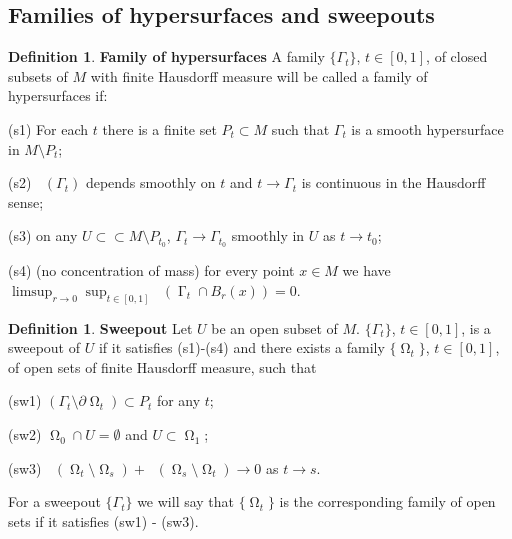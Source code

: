 \documentclass[12pt]{amsart}
\DeclareMathOperator{\Hn}{\mathcal{H}^n}
\DeclareMathOperator{\Hnn}{\mathcal{H}^{n+1}}
\DeclareMathOperator{\G}{\Gamma}
\DeclareMathOperator{\Om}{\Omega}
\theoremstyle{definition}
\newtheorem{definition}[theorem]{Definition}
\begin{document}
\subsection{Families of hypersurfaces
and sweepouts}

\begin{definition} \label{hypersurface_def}
\textbf{Family of hypersurfaces}
A family $\{\Gamma_t\}$, $t\in [0,1]$,
of closed subsets of $M$ with
finite Hausdorff measure 
will be called a family of hypersurfaces if:

\vspace{0.2in}

(s1) For each $t$ there is a finite set 
$P_t \subset M$ such that $\Gamma_t$ is a smooth
hypersurface in $M \setminus P_t$;

(s2) $\Hn(\Gamma_t)$ depends smoothly 
on $t$ and $t \rightarrow \Gamma_t$
is continuous in the
Hausdorff sense;

(s3) on any $U \subset \subset M \setminus P_{t_0}$, $\Gamma_t \rightarrow \Gamma_{t_0}$
smoothly in $U$ as $t \rightarrow t_0$;

(s4) (no concentration of mass) for every point $x \in M$ 
we have $\limsup_{r \rightarrow 0} \sup_{t \in [0,1]}  \Hn(\G_t \cap B_r(x)) = 0$.
\end{definition}


\begin{definition} \label{def: sweepout}
\textbf{Sweepout}
Let $U$ be an open subset of $M$.
$\{\Gamma_t \}$, $t \in [0,1]$, is a sweepout of $U$ 
if it satisfies (s1)-(s4) and there exists a family $\{  \Om_t\}$, 
$t \in [0,1]$, of open
sets of finite Hausdorff measure, such that

\vspace{0.2in}

(sw1) $(\Gamma_t  \setminus \partial   \Om_t)
\subset P_t$ for any $t$;

(sw2) $  \Om_0 \cap U = \emptyset$ and 
$U \subset   \Om_1$;

(sw3) $\Hnn(  \Om_t \setminus   \Om_s) + \Hnn(\Om_s \setminus   \Om_t) 
\rightarrow 0$ as $t \rightarrow s$.

\vspace{0.2in}

For a sweepout $\{ \Gamma_t \}$ 
we will say that $\{   \Om_t \}$
is the corresponding family of open sets 
if it satisfies (sw1) - (sw3).

\end{definition}
\end{document}
